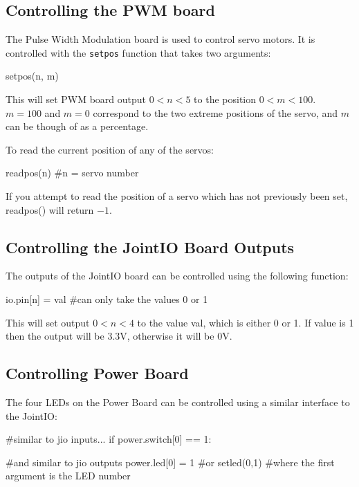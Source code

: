 \documentclass[a4paper, 12pt]{article}
\begin{document}
\subsection{Controlling the PWM board}
The Pulse Width Modulation board is used to control servo motors.  It is
controlled with the \texttt{setpos} function that takes two arguments:

\begin{verbatimtab}
setpos(n, m)
\end{verbatimtab}

This will set PWM board output $0<n<5$ to the position $0<m<100$. \(m = 100\) and \(m = 0\) correspond to the two extreme positions of the servo, and \(m\) can be though of as a percentage.

\vspace{12pt}
To read the current position of any of the servos:
\begin{verbatimtab}
readpos(n)	#n = servo number 
\end{verbatimtab}
If you attempt to read the position of a servo which has not previously been set, readpos() will return \(-1\).

\subsection{Controlling the JointIO Board Outputs}
The outputs of the JointIO board can be controlled using the following function:
\begin{verbatimtab}
io.pin[n] = val		#can only take the values 0 or 1
\end{verbatimtab}

This will set output $0<n<4$ to the value val, which is either 0 or 1.  If value is 1 then the output will be 3.3V, otherwise it will be 0V.

\subsection{Controlling Power Board}
The four LEDs on the Power Board can be controlled using a similar interface to the JointIO:
\begin{verbatimtab}
#similar to jio inputs...
if power.switch[0] == 1:
        
#and similar to jio outputs
power.led[0] = 1
#or
setled(0,1) #where the first argument is the LED number

\end{verbatimtab}
\end{document}

